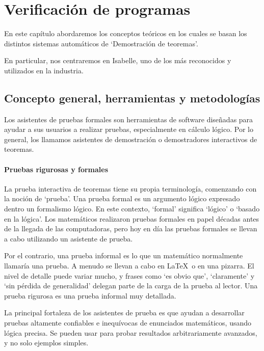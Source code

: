 \documentclass[12pt]{book}
\begin{document}

\chapter{Verificación de programas}

En este capítulo abordaremos los conceptos teóricos en los cuales se basan los distintos sistemas automáticos de `Demostración de teoremas'.

En particular, nos centraremos en Isabelle, uno de los más reconocidos y utilizados en la industria.

\section{Concepto general, herramientas y metodologías}

Los asistentes de pruebas formales son herramientas de software diseñadas para ayudar a sus usuarios a realizar pruebas, especialmente en cálculo lógico. Por lo general, los llamamos asistentes de demostración o demostradores interactivos de teoremas.

\subsubsection{Pruebas rigurosas y formales}

La prueba interactiva de teoremas tiene su propia terminología, comenzando con la noción de `prueba'. Una prueba formal es un argumento lógico expresado dentro un formalismo lógico. En este contexto, `formal' significa `lógico' o `basado en la lógica'. Los matemáticos realizaron pruebas formales en papel décadas antes de la llegada de las computadoras, pero hoy en día las pruebas formales se llevan a cabo utilizando un asistente de prueba.

Por el contrario, una prueba informal es lo que un matemático normalmente llamaría una prueba. A menudo se llevan a cabo en \LaTeX\ o en una pizarra. El nivel de detalle puede variar mucho, y frases como `es obvio que', `claramente' y `sin pérdida de generalidad' delegan parte de la carga de la prueba al lector. Una prueba rigurosa es una prueba informal muy detallada.

La principal fortaleza de los asistentes de prueba es que ayudan a desarrollar pruebas altamente confiables e inequívocas de enunciados matemáticos, usando lógica precisa. Se pueden usar para probar resultados arbitrariamente avanzados, y no solo ejemplos simples.
\end{document}
